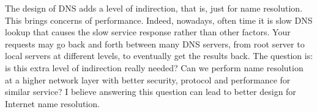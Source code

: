 \documentclass[11pt]{article}
\begin{document}
\vspace{1em}
The design of DNS adds a level of indirection, that is, just for name
resolution. This brings concerns of performance. Indeed, nowadays,
often time it is slow DNS lookup that causes the slow service response
rather than other factors. Your requests may go back and forth between many
DNS servers, from root server to local servers at different levels, to
eventually get the results back. The question is: is this extra level
of indirection really needed? Can we perform name resolution at a
higher network layer with better security, protocol and performance
for similar service? I believe answering this question can lead to
better design for Internet name resolution.
\end{document}
